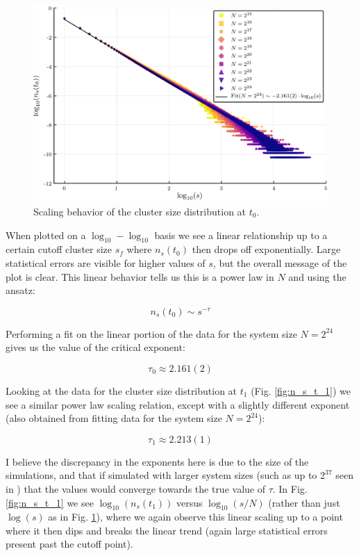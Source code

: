 \begin{figure}[H]
	\centering
	\includegraphics[width=350pt, clip]{images/n_s_t_0.png}
	\caption{Scaling behavior of the cluster size distribution at $t_0$.}
	\label{fig:n_s_t_0}
\end{figure}
When plotted on a $\log_{10}-\log_{10}$ basis we see a linear relationship up to a certain cutoff cluster size $s_f$ where $n_s(t_0)$ then drops off exponentially.
Large statistical errors are visible for higher values of $s$, but the overall message of the plot is clear.
This linear behavior tells us this is a power law in $N$ and using the ansatz:

\begin{equation}
	n_s(t_0) \sim s^{-\tau}
\end{equation}

Performing a fit on the linear portion of the data for the system size $N = 2^{24}$ gives us the value of the critical exponent:

\begin{equation}
	\tau_0 \approx 2.161(2)
\end{equation}

Looking at the data for the cluster size distribution at $t_1$ (Fig. \ref{fig:n_s_t_1}) we see a similar power law scaling relation, except with a slightly different exponent (also obtained from fitting data for the system size $N = 2^{24}$):

\begin{equation}
	 \tau_1 \approx 2.213(1)
\end{equation}

I believe the discrepancy in the exponents here is due to the size of the simulations, and that if simulated with larger system sizes (such as up to $2^{37}$ seen in \cite{Lee_1}) that the values would converge towards the true value of $\tau$.
In Fig. \ref{fig:n_s_t_1} we see $\log_{10}(n_s(t_1))$ versus $\log_{10}(s/N)$ (rather than just $\log(s)$ as in Fig. \ref{fig:n_s_t_0}), where we again observe this linear scaling up to a point where it then dips and breaks the linear trend (again large statistical errors present past the cutoff point).

